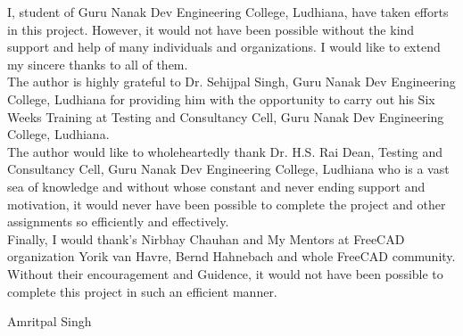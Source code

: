 \begin{Large}
\end{Large}

I, student of Guru Nanak Dev Engineering College, Ludhiana, have taken efforts in this project.
However, it would not have been possible without the kind support and help of many individuals
and organizations. I would like to extend my sincere thanks to all of them.\\

The author is highly grateful to Dr. Sehijpal Singh, Guru Nanak Dev Engineering College, Ludhiana for providing him with the opportunity to carry out his Six Weeks Training at
Testing and Consultancy Cell, Guru Nanak Dev Engineering College, Ludhiana.\\

The author would like to wholeheartedly thank Dr. H.S. Rai Dean, Testing and Consultancy
Cell, Guru Nanak Dev Engineering College, Ludhiana who is a vast sea of knowledge and without whose constant and never ending support and motivation, it would never have been possible to complete the project and other assignments so efficiently and effectively.\\

Finally, I would thank's Nirbhay Chauhan and My Mentors at FreeCAD organization Yorik van Havre, Bernd Hahnebach and whole FreeCAD community. Without their encouragement and Guidence, it would not have been possible to complete this project
in such an efficient manner.

\vskip 1.0cm 
\noindent Amritpal Singh
